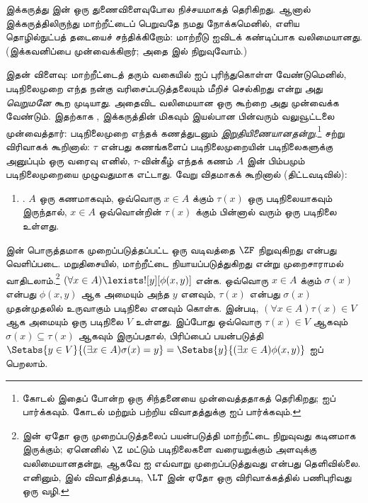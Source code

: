 \documentclass[../../../include/open-logic-section]{subfiles}
\begin{document}
இக்கருத்து \stagesinex{} இன் ஒரு துணைவிளைவுபோல நிச்சயமாகத் தெரிகிறது.
ஆனால் இக்கருத்திலிருந்து மாற்றீட்டைப் பெறுவதே நமது நோக்கமெனில், எளிய
தொழில்நுட்பத் தடையைச் சந்திக்கிறோம்: மாற்றீடு
 ஐவிடக் கண்டிப்பாக
வலிமையானது. (இக்கவனிப்பை \citet[\S13.2]{Potter2004} முன்வைக்கிறார்;
அதை  இல் நிறுவுவோம்.)

இதன் விளைவு: மாற்றீட்டைத் தரும் வகையில் \stagesinex{} ஐப் புரிந்துகொள்ள
வேண்டுமெனில், படிநிலைமுறை எந்த நன்கு வரிசைப்படுத்தலையும் மீறிச் செல்கிறது
என்று அது \emph{வெறுமனே} கூற முடியாது. அதைவிட வலிமையான ஒரு கூற்றை அது
முன்வைக்க வேண்டும். இதற்காக \cite{Shoenfield:AST}, இக்கருத்தின் மிகவும்
இயல்பான பின்வரும் வலுவூட்டலை முன்வைத்தார்: படிநிலைமுறை எந்தக் கணத்துடனும்
\emph{இறுதியிணையானதன்று}.\footnote{கோடல் இதைப் போன்ற ஒரு சிந்தனையை
முன்வைத்ததாகத் தெரிகிறது; \citet[p.~223]{Potter2004} ஐப் பார்க்கவும்.
கோடல் மற்றும் \citeauthor{Shoenfield:AST} பற்றிய விவாதத்துக்கு
\citet[90--5]{Incurvati2020} ஐப் பார்க்கவும்.} சற்று விரிவாகக் கூறினால்:
$\tau$ என்பது கணங்களைப் படிநிலைமுறையின் படிநிலைகளுக்கு அனுப்பும் ஒரு
வரைவு எனில், $\tau$-வின்கீழ் எந்தக் கணம் $A$ இன் பிம்பமும் படிநிலைமுறையை
முழுவதுமாக எட்டாது. வேறு விதமாகக் கூறினால் (திட்டவடிவில்):
\begin{enumerate}
	\item[] \stagescofin. $A$ ஒரு கணமாகவும், ஒவ்வொரு $x \in A$ க்கும்
	$\tau(x)$ ஒரு படிநிலையாகவும் இருந்தால், $x \in A$ ஒவ்வொன்றின்
	$\tau(x)$ க்கும் பின்னால் வரும் ஒரு படிநிலை உள்ளது.
\end{enumerate}
\stagescofin{} இன் பொருத்தமாக முறைப்படுத்தப்பட்ட ஒரு வடிவத்தை $\ZF$
நிறுவுகிறது என்பது வெளிப்படை. மறுதிசையில், \stagescofin{} மாற்றீட்டை
நியாயப்படுத்துகிறது என்று முறைசாராமல் வாதிடலாம்.\footnote{\stagescofin{}
இன் ஏதோ ஒரு முறைப்படுத்தலைப் பயன்படுத்தி மாற்றீட்டை நிறுவுவது கடினமாக
இருக்கும்; ஏனெனில் $\Z$ மட்டும் படிநிலைகளை வரையறுக்கும் அளவுக்கு
வலிமையானதன்று, ஆகவே \stagescofin{} ஐ எவ்வாறு முறைப்படுத்துவது என்பது
தெளிவில்லை. எனினும்,  இல்
விவாதித்தபடி, $\LT$ இன் ஏதோ ஒரு விரிவாக்கத்தில் பணிபுரிவது ஒரு வழி.}
$(\forall x \in A)\lexists![y][\phi(x,y)]$ என்க. ஒவ்வொரு $x \in A$
க்கும் $\sigma(x)$ என்பது $\phi(x,y)$ ஆக அமையும் அந்த $y$ எனவும்,
$\tau(x)$ என்பது $\sigma(x)$ முதன்முதலில் உருவாகும் படிநிலை எனவும் கொள்க.
\stagescofin{} இன்படி, $(\forall x \in A)\tau(x)\in V$ ஆக அமையும் ஒரு
படிநிலை $V$ உள்ளது. இப்போது ஒவ்வொரு $\tau(x) \in V$ ஆகவும்
$\sigma(x) \subseteq \tau(x)$ ஆகவும் இருப்பதால், பிரிப்பைப் பயன்படுத்தி
$\Setabs{y \in V}{(\exists x \in A)\sigma(x) = y} = \Setabs{y}{(\exists x \in
A)\phi(x,y)}$ ஐப் பெறலாம்.
\end{document}

